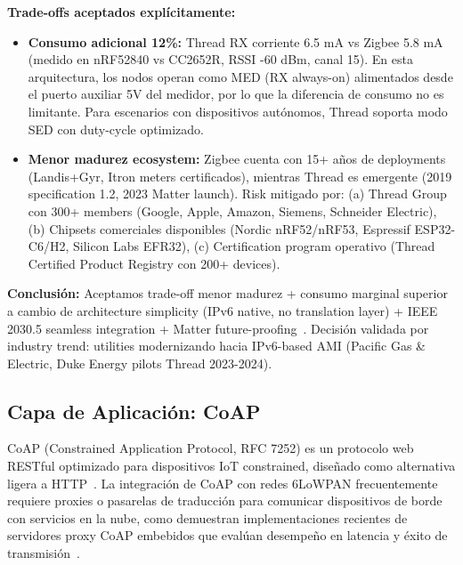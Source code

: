 \textbf{Trade-offs aceptados explícitamente:}

\begin{itemize}
    \item \textbf{Consumo adicional 12\%:} Thread RX corriente 6.5 mA vs Zigbee 5.8 mA (medido en nRF52840 vs CC2652R, RSSI -60 dBm, canal 15). En esta arquitectura, los nodos operan como MED (RX always-on) alimentados desde el puerto auxiliar 5V del medidor, por lo que la diferencia de consumo no es limitante. Para escenarios con dispositivos autónomos, Thread soporta modo SED con duty-cycle optimizado.
    
    \item \textbf{Menor madurez ecosystem:} Zigbee cuenta con 15+ años de deployments (Landis+Gyr, Itron meters certificados), mientras Thread es emergente (2019 specification 1.2, 2023 Matter launch). Risk mitigado por: (a) Thread Group con 300+ members (Google, Apple, Amazon, Siemens, Schneider Electric), (b) Chipsets comerciales disponibles (Nordic nRF52/nRF53, Espressif ESP32-C6/H2, Silicon Labs EFR32), (c) Certification program operativo (Thread Certified Product Registry con 200+ devices).
\end{itemize}

\textbf{Conclusión:} Aceptamos trade-off menor madurez + consumo marginal superior a cambio de architecture simplicity (IPv6 native, no translation layer) + IEEE 2030.5 seamless integration + Matter future-proofing~\cite{threadMatterConvergence2024}. Decisión validada por industry trend: utilities modernizando hacia IPv6-based AMI (Pacific Gas \& Electric, Duke Energy pilots Thread 2023-2024).

\subsection{Capa de Aplicación: CoAP}

CoAP (Constrained Application Protocol, RFC 7252) es un protocolo web RESTful optimizado para dispositivos IoT constrained, diseñado como alternativa ligera a HTTP~\cite{shahinzadehSmartHomeConnectivity2024,hossainComparativeStudyIoTCommunication2018}. La integración de CoAP con redes 6LoWPAN frecuentemente requiere proxies o pasarelas de traducción para comunicar dispositivos de borde con servicios en la nube, como demuestran implementaciones recientes de servidores proxy CoAP embebidos que evalúan desempeño en latencia y éxito de transmisión~\cite{amezcuavaldovinosDesignImplementationEvaluation2024}.

